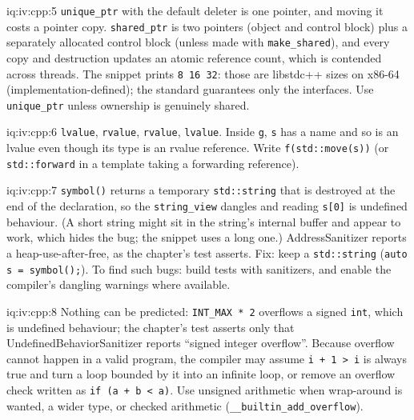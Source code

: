 \begin{solution}{iq:iv:cpp:5}
\texttt{unique\_ptr} with the default deleter is one pointer, and moving it costs a pointer copy. \texttt{shared\_ptr} is two
pointers (object and control block) plus a separately allocated control block (unless made with \texttt{make\_shared}), and every
copy and destruction updates an atomic reference count, which is contended across threads. The snippet prints \texttt{8 16 32}:
those are libstdc++ sizes on x86-64 (implementation-defined); the standard guarantees only the interfaces. Use
\texttt{unique\_ptr} unless ownership is genuinely shared.
\end{solution}

\begin{solution}{iq:iv:cpp:6}
\texttt{lvalue}, \texttt{rvalue}, \texttt{rvalue}, \texttt{lvalue}. Inside \texttt{g}, \texttt{s} has a name and so is an lvalue even
though its type is an rvalue reference. Write \texttt{f(std::move(s))} (or \texttt{std::forward} in a template taking a forwarding
reference).
\end{solution}

\begin{solution}{iq:iv:cpp:7}
\texttt{symbol()} returns a temporary \texttt{std::string} that is destroyed at the end of the declaration, so the
\texttt{string\_view} dangles and reading \texttt{s[0]} is undefined behaviour. (A short string might sit in the string's internal
buffer and appear to work, which hides the bug; the snippet uses a long one.) AddressSanitizer reports a heap-use-after-free,
as the chapter's test asserts. Fix: keep a \texttt{std::string} (\texttt{auto s = symbol();}). To find such bugs: build tests with
sanitizers, and enable the compiler's dangling warnings where available.
\end{solution}

\begin{solution}{iq:iv:cpp:8}
Nothing can be predicted: \texttt{INT\_MAX * 2} overflows a signed \texttt{int}, which is undefined behaviour; the chapter's test
asserts only that UndefinedBehaviorSanitizer reports ``signed integer overflow''. Because overflow cannot happen in a valid
program, the compiler may assume \texttt{i + 1 > i} is always true and turn a loop bounded by it into an infinite loop, or remove
an overflow check written as \texttt{if (a + b < a)}. Use unsigned arithmetic when wrap-around is wanted, a wider type, or checked
arithmetic (\texttt{\_\_builtin\_add\_overflow}).
\end{solution}

